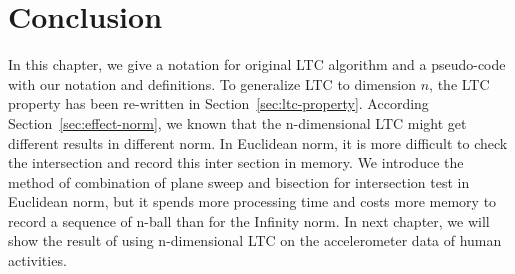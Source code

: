 \section{Conclusion}
In this chapter, we give a notation for original LTC algorithm and a pseudo-code
with our notation and definitions. To generalize LTC to dimension $n$, the LTC
property has been re-written in Section~\ref{sec:ltc-property}. According
Section~\ref{sec:effect-norm}, we known that the n-dimensional LTC might get
different results in different norm. In Euclidean norm, it is more difficult to
check the intersection and record this inter section in memory. We introduce the
method of combination of plane sweep and bisection for intersection test in
Euclidean norm, but it spends more processing time and costs more memory to
record a sequence of n-ball than for the Infinity norm. In next chapter, we will
show the result of using n-dimensional LTC on the accelerometer data of human
activities. 
